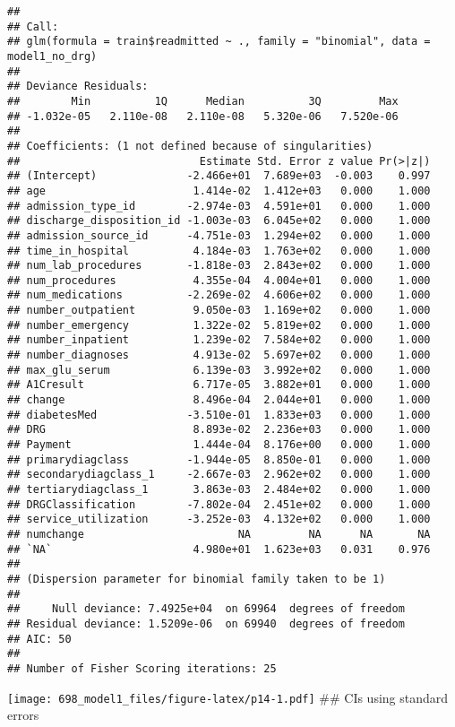 \documentclass[11pt,]{article}
\begin{document}
\begin{verbatim}
## 
## Call:
## glm(formula = train$readmitted ~ ., family = "binomial", data = model1_no_drg)
## 
## Deviance Residuals: 
##        Min          1Q      Median          3Q         Max  
## -1.032e-05   2.110e-08   2.110e-08   5.320e-06   7.520e-06  
## 
## Coefficients: (1 not defined because of singularities)
##                            Estimate Std. Error z value Pr(>|z|)
## (Intercept)              -2.466e+01  7.689e+03  -0.003    0.997
## age                       1.414e-02  1.412e+03   0.000    1.000
## admission_type_id        -2.974e-03  4.591e+01   0.000    1.000
## discharge_disposition_id -1.003e-03  6.045e+02   0.000    1.000
## admission_source_id      -4.751e-03  1.294e+02   0.000    1.000
## time_in_hospital          4.184e-03  1.763e+02   0.000    1.000
## num_lab_procedures       -1.818e-03  2.843e+02   0.000    1.000
## num_procedures            4.355e-04  4.004e+01   0.000    1.000
## num_medications          -2.269e-02  4.606e+02   0.000    1.000
## number_outpatient         9.050e-03  1.169e+02   0.000    1.000
## number_emergency          1.322e-02  5.819e+02   0.000    1.000
## number_inpatient          1.239e-02  7.584e+02   0.000    1.000
## number_diagnoses          4.913e-02  5.697e+02   0.000    1.000
## max_glu_serum             6.139e-03  3.992e+02   0.000    1.000
## A1Cresult                 6.717e-05  3.882e+01   0.000    1.000
## change                    8.496e-04  2.044e+01   0.000    1.000
## diabetesMed              -3.510e-01  1.833e+03   0.000    1.000
## DRG                       8.893e-02  2.236e+03   0.000    1.000
## Payment                   1.444e-04  8.176e+00   0.000    1.000
## primarydiagclass         -1.944e-05  8.850e-01   0.000    1.000
## secondarydiagclass_1     -2.667e-03  2.962e+02   0.000    1.000
## tertiarydiagclass_1       3.863e-03  2.484e+02   0.000    1.000
## DRGClassification        -7.802e-04  2.451e+02   0.000    1.000
## service_utilization      -3.252e-03  4.132e+02   0.000    1.000
## numchange                        NA         NA      NA       NA
## `NA`                      4.980e+01  1.623e+03   0.031    0.976
## 
## (Dispersion parameter for binomial family taken to be 1)
## 
##     Null deviance: 7.4925e+04  on 69964  degrees of freedom
## Residual deviance: 1.5209e-06  on 69940  degrees of freedom
## AIC: 50
## 
## Number of Fisher Scoring iterations: 25
\end{verbatim}

\texttt{[image: 698\_model1\_files/figure-latex/p14-1.pdf]} \#\# CIs using
standard errors
\end{document}
